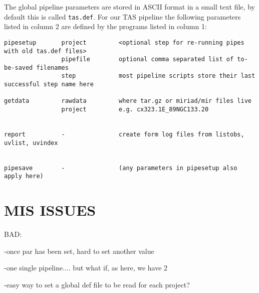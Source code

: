 \documentclass[preprint]{aastex} %
\begin{document}
The global pipeline parameters are stored in ASCII format in
a small text file, by default this is called {\tt tas.def}. 
For our TAS pipeline the following
parameters listed in column 2 are
defined by the programs listed in column 1:

\footnotesize
\begin{verbatim}
pipesetup       project         <optional step for re-running pipes with old tas.def files>
                pipefile        optional comma separated list of to-be-saved filenames
                step            most pipeline scripts store their last successful step name here

getdata         rawdata         where tar.gz or miriad/mir files live
                project         e.g. cx323.1E_89NGC133.20


report          -               create form log files from listobs, uvlist, uvindex


pipesave        -               (any parameters in pipesetup also apply here)

\end{verbatim}
\normalsize


\section{MIS ISSUES}

BAD:

-once par has been set, hard to set another value

-one single pipeline....  but what if, as here, we have 2

-easy way to set a global def file to be read for each project?
\end{document}
